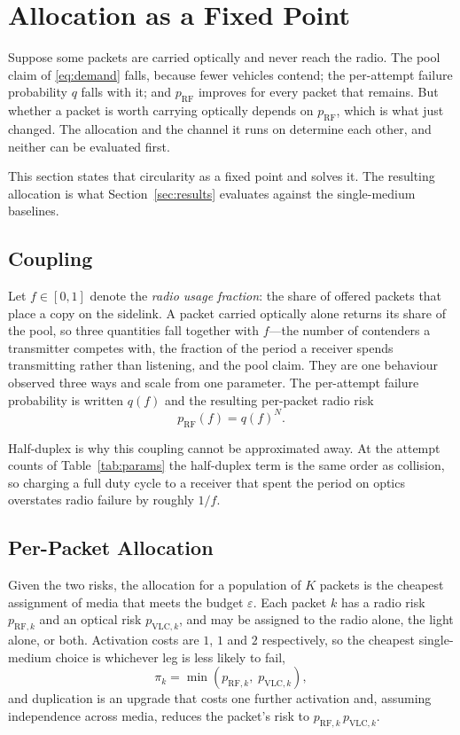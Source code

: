 \section{Allocation as a Fixed Point}
\label{sec:allocation}

Suppose some packets are carried optically and never reach the radio. The pool
claim of \eqref{eq:demand} falls, because fewer vehicles contend; the
per-attempt failure probability $q$ falls with it; and $p_{\mathrm{RF}}$
improves for every packet that remains. But whether a packet is worth carrying
optically depends on $p_{\mathrm{RF}}$, which is what just changed. The
allocation and the channel it runs on determine each other, and neither can be
evaluated first.

This section states that circularity as a fixed point and solves it. The
resulting allocation is what Section~\ref{sec:results} evaluates against the
single-medium baselines.

\subsection{Coupling}

Let $f \in [0,1]$ denote the \emph{radio usage fraction}: the share of offered
packets that place a copy on the sidelink. A packet carried optically alone
returns its share of the pool, so three quantities fall together with $f$---the
number of contenders a transmitter competes with, the fraction of the period a
receiver spends transmitting rather than listening, and the pool claim. They are
one behaviour observed three ways and scale from one parameter. The per-attempt
failure probability is written $q(f)$ and the resulting per-packet radio risk
\begin{equation}
  p_{\mathrm{RF}}(f) = q(f)^{N} .
  \label{eq:rf_of_f}
\end{equation}

Half-duplex is why this coupling cannot be approximated away. At the attempt
counts of Table~\ref{tab:params} the half-duplex term is the same order as
collision, so charging a full duty cycle to a receiver that spent the period on
optics overstates radio failure by roughly $1/f$.

\subsection{Per-Packet Allocation}

Given the two risks, the allocation for a population of $K$ packets is the
cheapest assignment of media that meets the budget $\varepsilon$. Each packet
$k$ has a radio risk $p_{\mathrm{RF},k}$ and an optical risk
$p_{\mathrm{VLC},k}$, and may be assigned to the radio alone, the light alone,
or both. Activation costs are $1$, $1$ and $2$ respectively, so the cheapest
single-medium choice is whichever leg is less likely to fail,
\begin{equation}
  \pi_k = \min\!\left(p_{\mathrm{RF},k},\; p_{\mathrm{VLC},k}\right),
  \label{eq:single}
\end{equation}
and duplication is an upgrade that costs one further activation and, assuming
independence across media, reduces the packet's risk to
$p_{\mathrm{RF},k}\,p_{\mathrm{VLC},k}$.

